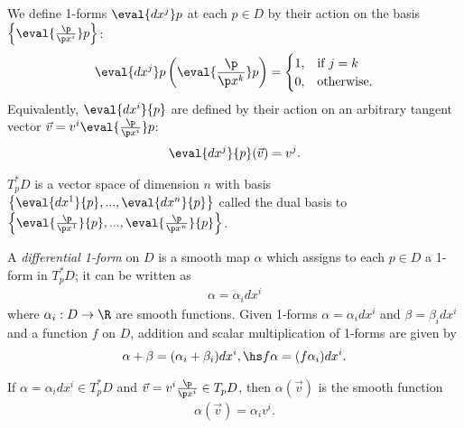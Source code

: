 \documentclass{article}
\begin{document}
\begin{definition}
    We define 1-forms $\eval{dx^j}p$ at each $p\in D$ by their action on the basis
    $\left\lbrace\eval{\frac{\p }{\p x^i}}p\right\rbrace$:
    \begin{align*}
        \eval{dx^j}p\left(\eval{\frac{\p }{\p x^k}}p\right)= \begin{cases}
            1, &\text{if } j = k\\
            0, &\text{otherwise}.
        \end{cases}
    \end{align*}
    Equivalently, $\eval{dx^i}{p}$ are defined by their action on an arbitrary tangent vector
    $\vec v = v^i\eval{\frac{\p }{\p x^i}}p$:
    \begin{align*}
        \eval{dx^j}{p}(\vec v) = v^j.
    \end{align*}
\end{definition}

\begin{lemma}
    $T_p^*D$ is a vector space of dimension $n$ with basis 
    $\left\lbrace \eval{dx^1}{p},...,\eval{dx^n}{p}\right\rbrace$ called the dual basis to
    $\left\lbrace \eval{\frac{\p }{\p x^1}}{p}, ..., \eval{\frac{\p }{\p x^n}}{p}\right\rbrace$.
\end{lemma}

\begin{definition}
    A \emph{differential 1-form} on $D$ is a smooth map $\alpha$ which assigns to each $p\in D$
    a 1-form in $T^*_pD$; it can be written as
    \begin{align*}
        \alpha = \alpha_i dx^i
    \end{align*}
    where $\alpha_i:D\to\R$ are smooth functions. Given 1-forms $\alpha=\alpha_idx^i$ and 
    $\beta=\beta_idx^i$ and a function $f$ on $D$, addition and scalar multiplication of 
    1-forms are given by
    \begin{align*}
        \alpha + \beta = (\alpha_i + \beta_i)dx^i,\hs f\alpha = (f\alpha_i)dx^i.
    \end{align*}
\end{definition}

\begin{lemma}[Notes 4.16]
    If $\alpha=\alpha_i dx^i\in T_p^*D$ and $\vec v=v^i\frac{\p }{\p x^i}\in T_pD$,
    then $\alpha(\vec v)$ is the smooth function
    \begin{align*}
        \alpha(\vec v) = \alpha_i v^i.    
    \end{align*}
\end{lemma}
\end{document}
